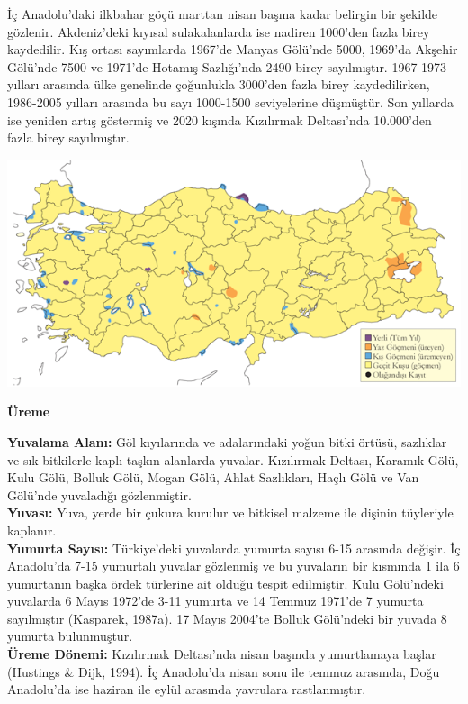 \documentclass[
  a4paper,
  DIV=11,
  numbers=noendperiod]{scrreprt}
\begin{document}
İç Anadolu'daki ilkbahar göçü marttan nisan başına kadar belirgin bir
şekilde gözlenir. Akdeniz'deki kıyısal sulakalanlarda ise nadiren
1000'den fazla birey kaydedilir. Kış ortası sayımlarda 1967'de Manyas
Gölü'nde 5000, 1969'da Akşehir Gölü'nde 7500 ve 1971'de Hotamış
Sazlığı'nda 2490 birey sayılmıştır. 1967-1973 yılları arasında ülke
genelinde çoğunlukla 3000'den fazla birey kaydedilirken, 1986-2005
yılları arasında bu sayı 1000-1500 seviyelerine düşmüştür. Son yıllarda
ise yeniden artış göstermiş ve 2020 kışında Kızılırmak Deltası'nda
10.000'den fazla birey sayılmıştır.

\includegraphics{images/harita_Page_014.png}

\textbf{Üreme}

\textbf{Yuvalama Alanı:} Göl kıyılarında ve adalarındaki yoğun bitki
örtüsü, sazlıklar ve sık bitkilerle kaplı taşkın alanlarda yuvalar.
Kızılırmak Deltası, Karamık Gölü, Kulu Gölü, Bolluk Gölü, Mogan Gölü,
Ahlat Sazlıkları, Haçlı Gölü ve Van Gölü'nde yuvaladığı gözlenmiştir.\\
\textbf{Yuvası:} Yuva, yerde bir çukura kurulur ve bitkisel malzeme ile
dişinin tüyleriyle kaplanır.\\
\textbf{Yumurta Sayısı:} Türkiye'deki yuvalarda yumurta sayısı 6-15
arasında değişir. İç Anadolu'da 7-15 yumurtalı yuvalar gözlenmiş ve bu
yuvaların bir kısmında 1 ila 6 yumurtanın başka ördek türlerine ait
olduğu tespit edilmiştir. Kulu Gölü'ndeki yuvalarda 6 Mayıs 1972'de 3-11
yumurta ve 14 Temmuz 1971'de 7 yumurta sayılmıştır (Kasparek, 1987a). 17
Mayıs 2004'te Bolluk Gölü'ndeki bir yuvada 8 yumurta bulunmuştur.\\
\textbf{Üreme Dönemi:} Kızılırmak Deltası'nda nisan başında yumurtlamaya
başlar (Hustings \& Dijk, 1994). İç Anadolu'da nisan sonu ile temmuz
arasında, Doğu Anadolu'da ise haziran ile eylül arasında yavrulara
rastlanmıştır.
\end{document}
